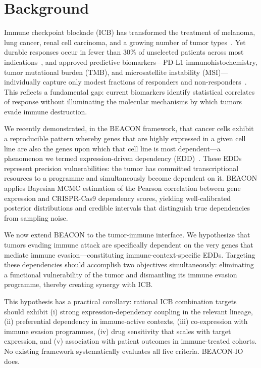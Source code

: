 \documentclass[12pt]{article}
\begin{document}
\section*{Background}

Immune checkpoint blockade (ICB) has transformed the treatment of melanoma, lung cancer, renal cell carcinoma, and a growing number of tumor types~\citep{Ribas2018, Sharma2015}. Yet durable responses occur in fewer than 30\% of unselected patients across most indications~\citep{Tumeh2014}, and approved predictive biomarkers---PD-L1 immunohistochemistry, tumor mutational burden (TMB), and microsatellite instability (MSI)---individually capture only modest fractions of responders and non-responders~\citep{Topalian2019}. This reflects a fundamental gap: current biomarkers identify statistical correlates of response without illuminating the molecular mechanisms by which tumors evade immune destruction.

We recently demonstrated, in the BEACON framework, that cancer cells exhibit a reproducible pattern whereby genes that are highly expressed in a given cell line are also the genes upon which that cell line is most dependent---a phenomenon we termed expression-driven dependency (EDD)~\citep{Elmas2026}. These EDDs represent precision vulnerabilities: the tumor has committed transcriptional resources to a programme and simultaneously become dependent on it. BEACON applies Bayesian MCMC estimation of the Pearson correlation between gene expression and CRISPR-Cas9 dependency scores, yielding well-calibrated posterior distributions and credible intervals that distinguish true dependencies from sampling noise.

We now extend BEACON to the tumor-immune interface. We hypothesize that tumors evading immune attack are specifically dependent on the very genes that mediate immune evasion---constituting immune-context-specific EDDs. Targeting these dependencies should accomplish two objectives simultaneously: eliminating a functional vulnerability of the tumor and dismantling its immune evasion programme, thereby creating synergy with ICB.

This hypothesis has a practical corollary: rational ICB combination targets should exhibit (i) strong expression-dependency coupling in the relevant lineage, (ii) preferential dependency in immune-active contexts, (iii) co-expression with immune evasion programmes, (iv) drug sensitivity that scales with target expression, and (v) association with patient outcomes in immune-treated cohorts. No existing framework systematically evaluates all five criteria. BEACON-IO does.
\end{document}
